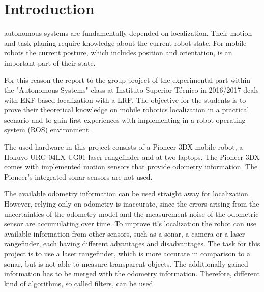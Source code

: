 \section{Introduction}
\label{sec:Introduction}


% 
% 
% 
% 
 autonomous systems are fundamentally depended on localization. Their motion and task planing require knowledge about the current robot state. For mobile robots the current posture, which includes position and orientation, is an important part of their state. 

For this reason the report to the group project of the experimental part within the "Autonomous Systems" class at Instituto Superior T\'{e}cnico in 2016/2017 deals with EKF-based localization with a LRF. The objective for the students is to prove their theoretical knowledge on mobile robotics localization in a practical scenario and to gain first experiences with implementing in a robot operating system (ROS) environment. 

The used hardware in this project consists of a Pioneer 3DX mobile robot, a Hokuyo URG-04LX-UG01 laser rangefinder and at two laptops. The Pioneer 3DX comes with implemented motion sensors that provide odometry information. The Pioneer's integrated sonar sensors are not used.

The available odometry information can be used straight away for localization. However, relying only on odometry is inaccurate, since the errors arising from the uncertainties of the odometry model and the measurement noise of the odometric sensor are accumulating over time. To improve it's  localization the robot can use available information from other sensors, such as a sonar, a camera or a laser rangefinder, each having different advantages and disadvantages.  The task for this project is to use a laser rangefinder, which is more accurate in comparison to a sonar, but is not able to measure transparent objects. The additionally gained information has to be merged with the odometry information. Therefore, different kind of algorithms, so called filters, can be used.

